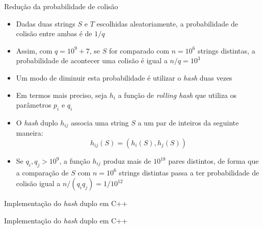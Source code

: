 \begin{frame}[fragile]{Redução da probabilidade de colisão}

    \begin{itemize}
        \item Dadas duas strings $S$ e $T$ escolhidas aleatoriamente, a probabilidade de
            colisão entre ambas é de $1/q$
        \pause


        \item Assim, com $q = 10^9 + 7$, se $S$ for comparado com $n = 10^6$ strings distintas,
            a probabilidade de acontecer uma colisão é igual a $n/q = 10^3$
        \pause


        \item Um modo de diminuir esta probabilidade é utilizar o \textit{hash} duas vezes
        \pause


        \item Em termos mais preciso, seja $h_i$ a função de \textit{rolling hash} que utiliza
            os parâmetros $p_i$ e $q_i$
        \pause


        \item O \textit{hash} duplo $h_{ij}$ associa uma string $S$ a um par de inteiros da 
            seguinte maneira:
            \[
                h_{ij}(S) = (h_i(S), h_j(S))
            \]
        \pause


        \item Se $q_i, q_j > 10^9$, a função $h_{ij}$ produz mais de $10^{18}$ pares distintos,
            de forma que a comparação de $S$ com $n = 10^6$ strings distintas passa a ter
            probabilidade de colisão igual a $n/(q_iq_j) = 1/10^{12}$
    \end{itemize}

\end{frame}


\begin{frame}[fragile]{Implementação do {\it hash} duplo em C++}
\end{frame}

\begin{frame}[fragile]{Implementação do {\it hash} duplo em C++}
\end{frame}
